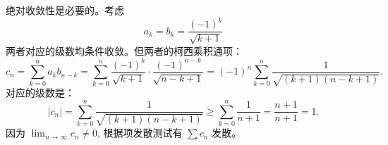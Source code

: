 \documentclass[
	UTF-8,
	11pt, %
	a4paper, %
]{LegrandOrangeBook}
\begin{document}

    \begin{remark}
    绝对收敛性是必要的。考虑
    $$a_k = b_k = \frac{(-1)^k}{\sqrt{k+1}}$$
    两者对应的级数均条件收敛。但两者的柯西乘积通项：
    \[ c_n = \sum_{k=0}^n a_k b_{n-k} = \sum_{k=0}^n \frac{(-1)^k}{\sqrt{k+1}} \cdot \frac{(-1)^{n-k}}{\sqrt{n-k+1}} = (-1)^n \sum_{k=0}^n \frac{1}{\sqrt{(k+1)(n-k+1)}}. \]
    对应的级数是：
    \[ |c_n| = \sum_{k=0}^n \frac{1}{\sqrt{(k+1)(n-k+1)}} \ge \sum_{k=0}^n \frac{1}{n+1} = \frac{n+1}{n+1} = 1. \]
    因为 $\lim_{n \to \infty} c_n \neq 0$, 根据项发散测试有 $\sum c_n$ 发散。
    \end{remark}
\end{document}
